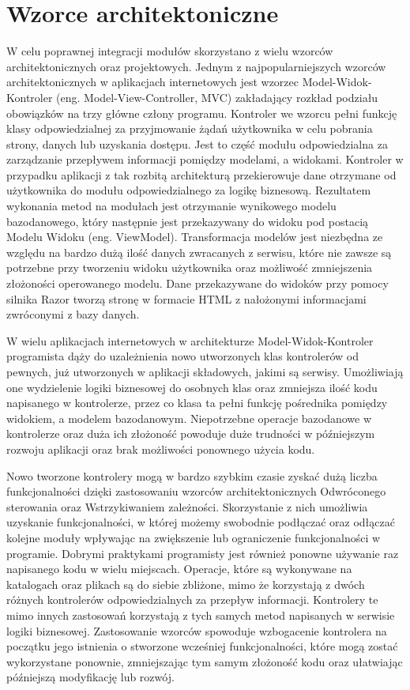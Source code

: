 \section{Wzorce architektoniczne}
{W celu poprawnej integracji modułów skorzystano z wielu wzorców architektonicznych oraz projektowych. Jednym z najpopularniejszych wzorców architektonicznych w aplikacjach internetowych jest wzorzec Model-Widok-Kontroler (eng. Model-View-Controller, MVC) zakładający rozkład podziału obowiązków na trzy główne człony programu. Kontroler we wzorcu pełni funkcję klasy odpowiedzialnej za przyjmowanie żądań użytkownika w celu pobrania strony, danych lub uzyskania dostępu. Jest to część modułu odpowiedzialna za zarządzanie przepływem informacji pomiędzy modelami, a widokami. Kontroler w przypadku aplikacji z tak rozbitą architekturą przekierowuje dane otrzymane od użytkownika do modułu odpowiedzialnego za logikę biznesową. Rezultatem wykonania metod na modułach jest otrzymanie wynikowego modelu bazodanowego, który następnie jest przekazywany do widoku pod postacią Modelu Widoku (eng. ViewModel). Transformacja modelów jest niezbędna ze względu na bardzo dużą ilość danych zwracanych z serwisu, które nie zawsze są potrzebne przy tworzeniu widoku użytkownika oraz możliwość zmniejszenia złożoności operowanego modelu. Dane przekazywane do widoków przy pomocy silnika Razor tworzą stronę w formacie HTML z nałożonymi informacjami zwróconymi z bazy danych.

W wielu aplikacjach internetowych w architekturze Model-Widok-Kontroler programista dąży do uzależnienia nowo utworzonych klas kontrolerów od pewnych, już utworzonych w aplikacji składowych, jakimi są serwisy. Umożliwiają one wydzielenie logiki biznesowej do osobnych klas oraz zmniejsza ilość kodu napisanego w kontrolerze, przez co klasa ta pełni funkcję pośrednika pomiędzy widokiem, a modelem bazodanowym. Niepotrzebne operacje bazodanowe w kontrolerze oraz duża ich złożoność powoduje duże trudności w późniejszym rozwoju aplikacji oraz brak możliwości ponownego użycia kodu. 

Nowo tworzone kontrolery mogą w bardzo szybkim czasie zyskać dużą liczba funkcjonalności dzięki zastosowaniu wzorców architektonicznych Odwróconego sterowania oraz Wstrzykiwaniem zależności. Skorzystanie z nich umożliwia uzyskanie funkcjonalności, w której możemy swobodnie podłączać oraz odłączać kolejne moduły wpływając na zwiększenie lub ograniczenie funkcjonalności w programie. Dobrymi praktykami programisty jest również ponowne używanie raz napisanego kodu w wielu miejscach. Operacje, które są wykonywane na katalogach oraz plikach są do siebie zbliżone, mimo że korzystają z dwóch różnych kontrolerów odpowiedzialnych za przepływ informacji. Kontrolery te mimo innych zastosowań korzystają z tych samych metod napisanych w serwisie logiki biznesowej. Zastosowanie wzorców spowoduje wzbogacenie kontrolera na początku jego istnienia o stworzone wcześniej funkcjonalności, które mogą zostać wykorzystane ponownie, zmniejszając tym samym złożoność kodu oraz ułatwiając późniejszą modyfikację lub rozwój. 

}
